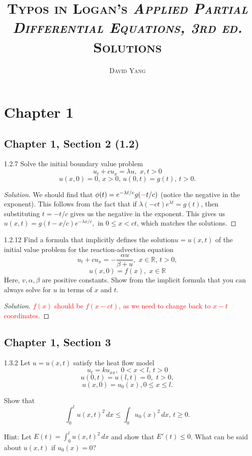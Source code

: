 \documentclass[11pt]{article}
\newenvironment{solution}
  {\renewcommand\qedsymbol{$\blacksquare$}\begin{proof}[Solution]}
  {\end{proof}}
\theoremstyle{definition}
\begin{document}
\title{\large	{\textsc{Typos in Logan's \textit{Applied Partial Differential Equations, 3rd ed.} Solutions}}}
\author{\textsc{David Yang}}
\date{}
\maketitle

\setcounter{tocdepth}{2}

\tableofcontents
\newpage
\vspace{1em}

\section{Chapter 1}
\setcounter{subsection}{1}
\subsection{Chapter 1, Section 2 (1.2)}
\begin{exercise}{1.2.7} Solve the initial boundary value problem \[u_t+cu_x = \lambda u, \, \, x, t > 0 \]
\[u(x,0)=0, \, x>0, \, u(0,t)=g(t), \, t > 0.\]
\end{exercise}

\begin{solution}
We should find that $\phi(t) = e^{-\lambda t/c} g(\textcolor{red}{-}t/c)$ (notice the negative in the exponent). This follows from the fact that if $\lambda(-ct)e^{\lambda t} = g(t)$, then substituting $t = -t/c$ gives us the negative in the exponent.
This gives us $u(x, t) = g(t-x/c)e^{-\lambda x/c},$ in $0 \leq x < ct$, which matches the solutions.
\end{solution}

\begin{exercise}{1.2.12} Find a formula that implicitly defines the solution$ u = u(x, t)$ of the initial value problem for the reaction-advection equation
\[ u_t + cu_x = -\frac{\alpha u}{\beta + u}, \, \, x \in \mathbb{R}, \, t > 0, \] 
\[ u(x,0) = f(x), \, \, x \in \mathbb{R} \]
  Here, $v, \alpha, \beta$ are positive constants. Show from the implicit formula that you can always solve for $u$ in terms of $x$ and $t$.
  \end{exercise}
  
  \begin{solution}
  \textcolor{red}{$f(x)$ should be $f(x-ct)$, as we need to change back to $x-t$ coordinates.}
  \end{solution}

\subsection{Chapter 1, Section 3}
\begin{exercise}{1.3.2}
  Let $u = u(x, t)$ satisfy the heat flow model 
  \[ u_t =ku_{xx}, \, \, 0<x<l, \, t>0 \]
  \[ u(0,t) = u(l,t) = 0, \, \, t > 0,\]
  \[ u(x,0)=u_0(x), 0 \leq x \leq l.\] 
  
  Show that
  \[ \int_0^l u(x, t)^2 \, dx \leq \int_0 u_0(x)^2 \, dx, \, t \geq 0. \]
  
  Hint: Let $E(t) = \int_0^l u(x, t)^2 \, dx$ and show that $E'(t) \leq 0$. What can be said about $u(x, t)$ if $u_0(x) = 0$?
\end{exercise}
\end{document}
